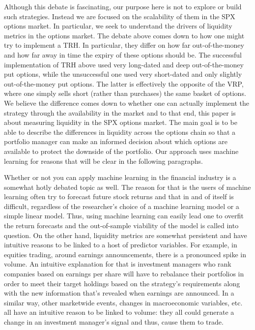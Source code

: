 \documentclass[12pt]{article}
\numberwithin{theorem}{section}
\numberwithin{equation}{section}
\numberwithin{remark}{section}
\numberwithin{definition}{section}
\numberwithin{theorem}{section}
\numberwithin{lemma}{section}
\numberwithin{example}{section}
\begin{document}
Although this debate is fascinating, our purpose here is not to explore or build such strategies. Instead we are focused on the scalability of them in the SPX options market. In particular, we seek to understand the drivers of liquidity metrics in the options market. The debate above comes down to how one might try to implement a TRH. In particular, they differ on how far out-of-the-money and how far away in time the expiry of these options should be. The successful implementation of TRH above used very long-dated and deep out-of-the-money put options, while the unsuccessful one used very short-dated and only slightly out-of-the-money put options. The latter is effectively the opposite of the VRP, where one simply sells short (rather than purchases) the same basket of options. We believe the difference comes down to whether one can actually implement the strategy through the availability in the market and to that end, this paper is about measuring liquidity in the SPX options market. The main goal is to be able to describe the differences in liquidity across the options chain so that a portfolio manager can make an informed decision about which options are available to protect the downside of the portfolio. Our approach uses machine learning for reasons that will be clear in the following paragraphs. 

Whether or not you can apply machine learning in the financial industry is a somewhat hotly debated topic as well. The reason for that is the users of machine learning often try to forecast future stock returns and that in and of itself is difficult, regardless of the researcher's choice of a machine learning model or a simple linear model. Thus, using machine learning can easily lead one to overfit the return forecasts and the out-of-sample viability of the model is called into question. On the other hand, liquidity metrics are somewhat persistent and have intuitive reasons to be linked to a host of predictor variables. For example, in equities trading, around earnings announcements, there is a pronounced spike in volume. An intuitive explanation for that is investment managers who rank companies based on earnings per share will have to rebalance their portfolios in order to meet their target holdings based on the strategy's requirements along with the new information that's revealed when earnings are announced. In a similar way, other marketwide events, changes in macroeconomic variables, etc. all have an intuitive reason to be linked to volume: they all could generate a change in an investment manager's signal and thus, cause them to trade. 
\end{document}
